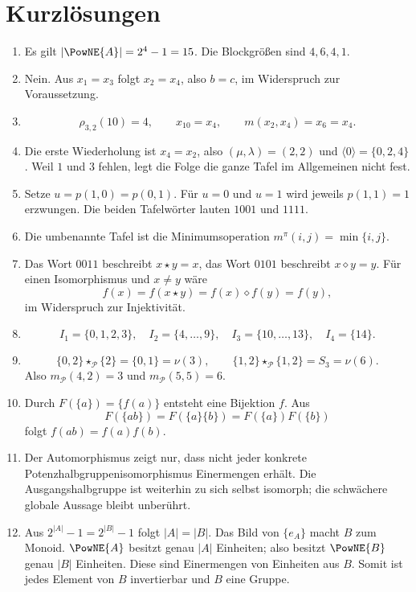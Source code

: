 \documentclass[main.tex]{subfiles}
\begin{document}
\clearpage
\section{Kurzlösungen}

\begin{enumerate}
  \item Es gilt \(|\PowNE{A}|=2^4-1=15\).  Die Blockgrößen sind
    \(4,6,4,1\).

  \item Nein.  Aus \(x_1=x_3\) folgt \(x_2=x_4\), also \(b=c\), im
    Widerspruch zur Voraussetzung.

  \item
    \[
      \rho_{3,2}(10)=4,\qquad x_{10}=x_4,\qquad
      m(x_2,x_4)=x_6=x_4.
    \]

  \item Die erste Wiederholung ist \(x_4=x_2\), also
    \((\mu,\lambda)=(2,2)\) und
    \(\langle0\rangle=\{0,2,4\}\).  Weil \(1\) und \(3\) fehlen, legt die
    Folge die ganze Tafel im Allgemeinen nicht fest.

  \item Setze \(u=p(1,0)=p(0,1)\).  Für \(u=0\) und \(u=1\) wird jeweils
    \(p(1,1)=1\) erzwungen.  Die beiden Tafelwörter lauten \(1001\) und
    \(1111\).

  \item Die umbenannte Tafel ist die Minimumsoperation
    \(m^\pi(i,j)=\min\{i,j\}\).

  \item Das Wort \(0011\) beschreibt \(x\star y=x\), das Wort \(0101\)
    beschreibt \(x\diamond y=y\).  Für einen Isomorphismus und
    \(x\neq y\) wäre
    \[
      f(x)=f(x\star y)=f(x)\diamond f(y)=f(y),
    \]
    im Widerspruch zur Injektivität.

  \item
    \[
      I_1=\{0,1,2,3\},\quad
      I_2=\{4,\ldots,9\},\quad
      I_3=\{10,\ldots,13\},\quad
      I_4=\{14\}.
    \]

  \item
    \[
      \{0,2\}\star_{\mathcal P}\{2\}=\{0,1\}=\nu(3),
      \qquad
      \{1,2\}\star_{\mathcal P}\{1,2\}=S_3=\nu(6).
    \]
    Also \(m_{\mathcal P}(4,2)=3\) und
    \(m_{\mathcal P}(5,5)=6\).

  \item Durch \(F(\{a\})=\{f(a)\}\) entsteht eine Bijektion \(f\).  Aus
    \[
      F(\{ab\})=F(\{a\}\{b\})=F(\{a\})F(\{b\})
    \]
    folgt \(f(ab)=f(a)f(b)\).

  \item Der Automorphismus zeigt nur, dass nicht jeder konkrete
    Potenzhalbgruppenisomorphismus Einermengen erhält.  Die
    Ausgangshalbgruppe ist weiterhin zu sich selbst isomorph; die schwächere
    globale Aussage bleibt unberührt.

  \item Aus \(2^{|A|}-1=2^{|B|}-1\) folgt \(|A|=|B|\).  Das Bild von
    \(\{e_A\}\) macht \(B\) zum Monoid.  \(\PowNE{A}\) besitzt genau
    \(|A|\) Einheiten; also besitzt \(\PowNE{B}\) genau \(|B|\) Einheiten.
    Diese sind Einermengen von Einheiten aus \(B\).  Somit ist jedes Element
    von \(B\) invertierbar und \(B\) eine Gruppe.
\end{enumerate}
\end{document}
